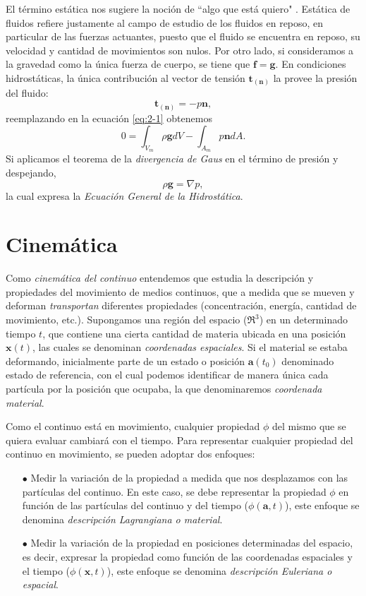 \documentclass[a4paper,10pt, oneside]{book}
\begin{document}
El término estática nos sugiere la noción de ``algo que está quiero" . Estática de fluidos refiere justamente al campo de estudio de los fluidos en reposo, en particular de las fuerzas actuantes, puesto que el fluido se encuentra en reposo, su velocidad y cantidad de movimientos son nulos. Por otro lado, si consideramos a la gravedad como la única fuerza de cuerpo, se tiene que $\mathbf{f} = \mathbf{g}$. En condiciones hidrostáticas, la única contribución al vector de tensión $ \mathbf{t_{(n)}}$ la provee la presión del fluido:
\begin{equation}
	\mathbf{t_{(n)}} = -p \mathbf{n}, \nonumber
\end{equation}
reemplazando en la ecuación \ref{eq:2-1} obtenemos
\begin{equation}
	0 = \int_{V_m} \rho \mathbf{g} dV - \int_{A_m} p \mathbf{n} dA. \nonumber
\end{equation}
Si aplicamos el teorema de la \textit{divergencia de Gaus} en el término de presión y despejando, 
\begin{equation}
	\rho  \mathbf{g} = \nabla p, \nonumber
\end{equation}
la cual expresa la \textit{Ecuación General de la Hidrostática}.

\section{Cinemática}

Como \textit{cinemática del continuo} entendemos que estudia la descripción y propiedades del movimiento de medios continuos, que a medida que se mueven y deforman \textit{transportan} diferentes propiedades (concentración, energía, cantidad de movimiento, etc.). Supongamos una región del espacio ($\Re^3$) en un determinado tiempo $t$, que contiene una cierta cantidad de materia ubicada en una posición $\mathbf{x}(t)$, las cuales se denominan \textit{coordenadas espaciales}. Si el material se estaba deformando, inicialmente parte de un estado o posición $\mathbf{a}(t_0)$ denominado estado de referencia, con el cual podemos identificar de manera única cada partícula por la posición que ocupaba, la que denominaremos \textit{coordenada material}.

Como el continuo está en movimiento, cualquier propiedad $\phi$ del mismo que se quiera evaluar cambiará con el tiempo. Para representar cualquier propiedad del continuo en movimiento, se pueden adoptar dos enfoques:
\begin{itemize}
	\item[$\bullet$] Medir la variación de la propiedad a medida que nos desplazamos con las partículas del continuo. En este caso, se debe representar la propiedad $\phi$ en función de las partículas del continuo y del tiempo ($\phi(\mathbf{a},t)$), este enfoque se denomina \textit{descripción Lagrangiana o material}.
	\item[$\bullet$] Medir la variación de la propiedad en posiciones determinadas del espacio, es decir, expresar la propiedad como función de las coordenadas espaciales y el tiempo ($\phi(\mathbf{x},t)$), este enfoque se denomina \textit{descripción Euleriana o espacial}.
\end{itemize}
\end{document}
